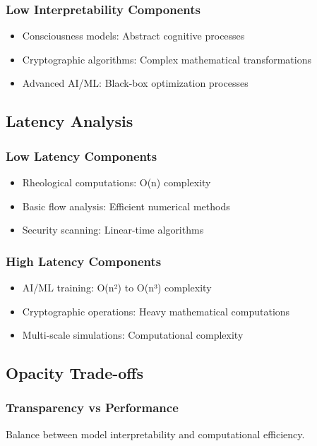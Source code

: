 \documentclass[11pt,a4paper]{article}
\begin{document}
\subsubsection{Low Interpretability Components}
\begin{itemize}
    \item Consciousness models: Abstract cognitive processes
    \item Cryptographic algorithms: Complex mathematical transformations
    \item Advanced AI/ML: Black-box optimization processes
\end{itemize}

\subsection{Latency Analysis}

\subsubsection{Low Latency Components}
\begin{itemize}
    \item Rheological computations: O(n) complexity
    \item Basic flow analysis: Efficient numerical methods
    \item Security scanning: Linear-time algorithms
\end{itemize}

\subsubsection{High Latency Components}
\begin{itemize}
    \item AI/ML training: O(n²) to O(n³) complexity
    \item Cryptographic operations: Heavy mathematical computations
    \item Multi-scale simulations: Computational complexity
\end{itemize}

\subsection{Opacity Trade-offs}

\subsubsection{Transparency vs Performance}
Balance between model interpretability and computational efficiency.
\end{document}
